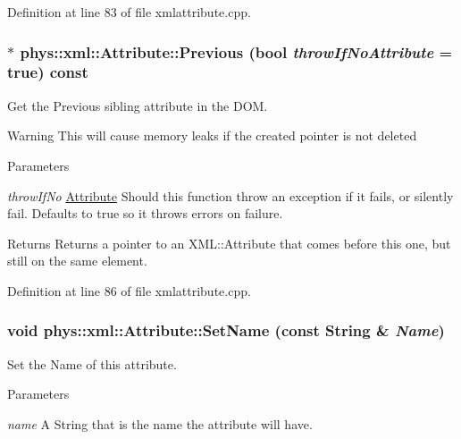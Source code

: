 Definition at line 83 of file xmlattribute.cpp.

\hypertarget{classphys_1_1xml_1_1Attribute_a3c9fdaa3f88cdf90d61af77cb33e022e}{
\subsubsection[{Previous}]{ $\ast$ phys::xml::Attribute::Previous (bool {\em throwIfNoAttribute} = {\ttfamily true}) const}}
\label{da/ddf/classphys_1_1xml_1_1Attribute_a3c9fdaa3f88cdf90d61af77cb33e022e}


Get the Previous sibling attribute in the DOM. 

\begin{DoxyWarning}{Warning}
This will cause memory leaks if the created pointer is not deleted 
\end{DoxyWarning}

\begin{DoxyParams}{Parameters}
\item[{\em throwIfNo}]\hyperlink{classphys_1_1xml_1_1Attribute}{Attribute} Should this function throw an exception if it fails, or silently fail. Defaults to true so it throws errors on failure. \end{DoxyParams}
\begin{DoxyReturn}{Returns}
Returns a pointer to an XML::Attribute that comes before this one, but still on the same element. 
\end{DoxyReturn}


Definition at line 86 of file xmlattribute.cpp.

\hypertarget{classphys_1_1xml_1_1Attribute_a9c90f6c8b6c409309fd503e1fe4a71bd}{
\subsubsection[{SetName}]{\setlength{\rightskip}{0pt plus 5cm}void phys::xml::Attribute::SetName (const {\bf String} \& {\em Name})}}
\label{da/ddf/classphys_1_1xml_1_1Attribute_a9c90f6c8b6c409309fd503e1fe4a71bd}


Set the Name of this attribute. 


\begin{DoxyParams}{Parameters}
\item[{\em name}]A String that is the name the attribute will have. \end{DoxyParams}


